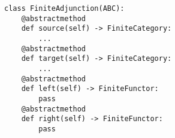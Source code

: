 \begin{verbatim}
class FiniteAdjunction(ABC):
    @abstractmethod
    def source(self) -> FiniteCategory:
        ...
    @abstractmethod
    def target(self) -> FiniteCategory:
        ...
    @abstractmethod
    def left(self) -> FiniteFunctor:
        pass
    @abstractmethod
    def right(self) -> FiniteFunctor:
        pass
\end{verbatim}
